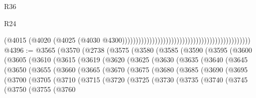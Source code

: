 \begin{lexlean}{R36}
\begin{lexlean}{R24}
\begin{coremodule}
{{{{{{{{{{{{{{{{{{{{{{{{{{{{{{{{{{{{{{{{{{{{{{{{{{{{{{{{{{{{{{{{{{{{{{{{{{{{{{{{{{{{{{{{{{{{{{{{{{{{{{{{{{{{{{{{{{{{{{{{{{{{{{{{{{{{{{{{{{{{{{{{{{{{{{{{{{{{{{{{{{{{{{{{{{{{{{{{{{{{{{{{{{{{{{{{{{{                                                                                          (@4015
                                                                                            (@4020
                                                                                              (@4025
                                                                                                (@4030
                                                                                                  @4300)))))))))))))))))))))))))))))))))))))))))))))))
@4396 := @3565
    (@3570
      (@2738
        (@3575
          (@3580
            (@3585
              (@3590
                (@3595
                  (@3600
                    (@3605
                      (@3610
                        (@3615
                          (@3619
                            (@3620
                              (@3625
                                (@3630
                                  (@3635
                                    (@3640
                                      (@3645
                                        (@3650
                                          (@3655
                                            (@3660
                                              (@3665
                                                (@3670
                                                  (@3675
                                                    (@3680
                                                      (@3685
                                                        (@3690
                                                          (@3695
                                                            (@3700
                                                              (@3705
                                                                (@3710
                                                                  (@3715
                                                                    (@3720
                                                                      (@3725
                                                                        (@3730
                                                                          (@3735
                                                                            (@3740
                                                                              (@3745
                                                                                (@3750
                                                                                  (@3755
                                                                                    (@3760
}}}}}}}}}}}}}}}}}}}}}}}}}}}}}}}}}}}}}}}}}}}}}}}}}}}}}}}}}}}}}}}}}}}}}}}}}}}}}}}}}}}}}}}}}}}}}}}}}}}}}}}}}}}}}}}}}}}}}}}}}}}}}}}}}}}}}}}}}}}}}}}}}}}}}}}}}}}}}}}}}}}}}}}}}}}}}}}}}}}}}}}}}}}}}}}}}}}
\end{coremodule}
\end{lexlean}
\end{lexlean}
